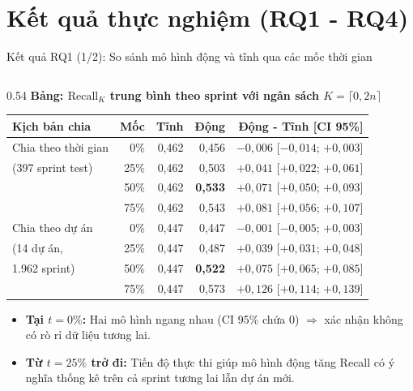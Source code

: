 \section{Kết quả thực nghiệm (RQ1 - RQ4)}

\begin{frame}{Kết quả RQ1 (1/2): So sánh mô hình động và tĩnh qua các mốc thời gian}
  \scriptsize
  \begin{columns}[T,onlytextwidth]
    \begin{column}{0.54\textwidth}
      \textbf{Bảng: $\text{Recall}_K$ trung bình theo sprint với ngân sách $K = \lceil 0{,}2n \rceil$}
      \vspace{0.04cm}
      \setlength{\tabcolsep}{2.8pt}
      \renewcommand{\arraystretch}{1.14}
      \begin{tabular}{l|r|r|r|r}
        \textbf{Kịch bản chia} & \textbf{Mốc} & \textbf{Tĩnh} & \textbf{Động} & \textbf{Động - Tĩnh [CI 95\%]} \\
        \hline
        Chia theo thời gian & 0\% & 0,462 & 0,456 & $-0{,}006$ [$-0{,}014$; $+0{,}003$] \\
        (397 sprint test) & 25\% & 0,462 & 0,503 & \alert{$+0{,}041$} [$+0{,}022$; $+0{,}061$] \\
         & 50\% & 0,462 & \textbf{0,533} & \alert{$+0{,}071$} [$+0{,}050$; $+0{,}093$] \\
         & 75\% & 0,462 & 0,543 & \alert{$+0{,}081$} [$+0{,}056$; $+0{,}107$] \\
        \hline
        Chia theo dự án & 0\% & 0,447 & 0,447 & $-0{,}001$ [$-0{,}005$; $+0{,}003$] \\
        (14 dự án, & 25\% & 0,447 & 0,487 & \alert{$+0{,}039$} [$+0{,}031$; $+0{,}048$] \\
        1.962 sprint) & 50\% & 0,447 & \textbf{0,522} & \alert{$+0{,}075$} [$+0{,}065$; $+0{,}085$] \\
         & 75\% & 0,447 & 0,573 & \alert{$+0{,}126$} [$+0{,}114$; $+0{,}139$] \\
      \end{tabular}
      \vspace{0.08cm}
      \begin{itemize}
        \setlength{\itemsep}{2pt}
        \item \textbf{Tại $t = 0\%$:} Hai mô hình ngang nhau (CI 95\% chứa 0) $\Rightarrow$ xác nhận không có rò rỉ dữ liệu tương lai.
        \item \textbf{Từ $t = 25\%$ trở đi:} Tiến độ thực thi giúp mô hình động tăng Recall có ý nghĩa thống kê trên cả sprint tương lai lẫn dự án mới.

\end{itemize}
\end{column}
\end{columns}
\end{frame}

